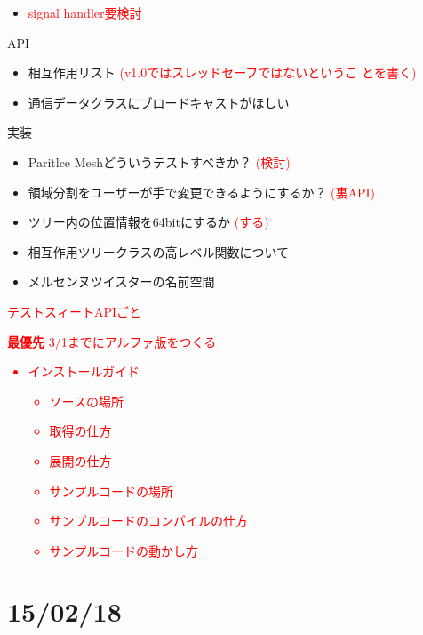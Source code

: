 \documentclass[12pt,a4paper]{jarticle}
\newcommand{\redtext}[1]{\textcolor{red}{#1}}
\begin{document}
\begin{itemize}
\begin{itemize}
\begin{itemize}
    場合)
    \item \redtext{浮動小数点例外？}
    \item \redtext{セグメンテーションフォールト？}
    \end{itemize}
  \item \redtext{signal handler要検討}
  \end{itemize}
\item API
  \begin{itemize}
  \item 相互作用リスト \redtext{(v1.0ではスレッドセーフではないというこ
    とを書く)}
  \item 通信データクラスにブロードキャストがほしい
  \end{itemize}
\item 実装
  \begin{itemize}
  \item Paritlce Meshどういうテストすべきか？ \redtext{(検討)}
  \item 領域分割をユーザーが手で変更できるようにするか？ \redtext{(裏API)}
  \item ツリー内の位置情報を64bitにするか \redtext{(する)}
  \item 相互作用ツリークラスの高レベル関数について
  \item メルセンヌツイスターの名前空間
  \end{itemize}
\item \redtext{テストスィートAPIごと}
  \redtext{
  \item {\bf 最優先} 3/1までにアルファ版をつくる
    \begin{itemize}
    \item インストールガイド
      \begin{itemize}
      \item ソースの場所
      \item 取得の仕方
      \item 展開の仕方
      \item サンプルコードの場所
      \item サンプルコードのコンパイルの仕方
      \item サンプルコードの動かし方
      \end{itemize}
    \end{itemize}
  }
\end{itemize}

\newpage

\section{15/02/18}
\end{document}

